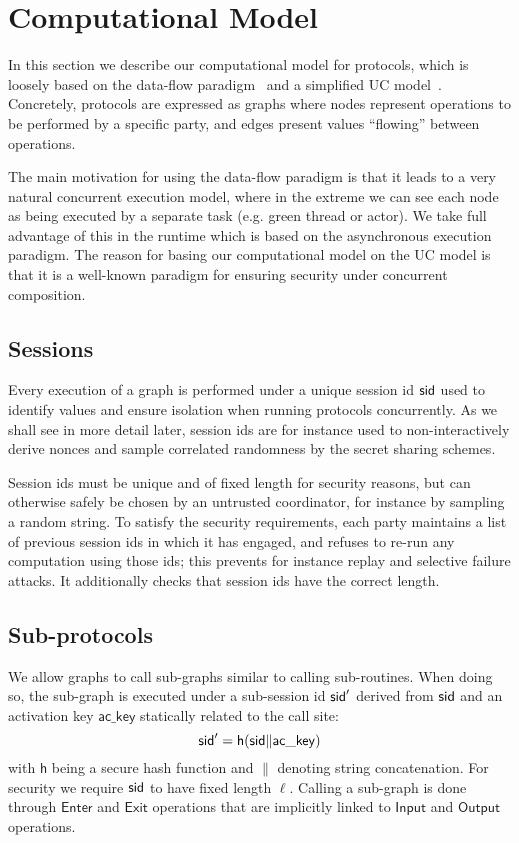 \section{Computational Model}

In this section we describe our computational model for protocols, which is loosely based on the data-flow paradigm~\cite{abadi16} and a simplified UC model~\cite{canetti-cohen-lindell15}. Concretely, protocols are expressed as graphs where nodes represent operations to be performed by a specific party, and edges present values ``flowing'' between operations.

The main motivation for using the data-flow paradigm is that it leads to a very natural concurrent execution model, where in the extreme we can see each node as being executed by a separate task (e.g. green thread or actor). We take full advantage of this in the runtime which is based on the asynchronous execution paradigm. The reason for basing our computational model on the UC model is that it is a well-known paradigm for ensuring security under concurrent composition.


\subsection{Sessions}

Every execution of a graph is performed under a unique session id $\mathsf{sid}$ used to identify values and ensure isolation when running protocols concurrently. As we shall see in more detail later, session ids are for instance used to non-interactively derive nonces and sample correlated randomness by the secret sharing schemes.

Session ids must be unique and of fixed length for security reasons, but can otherwise safely be chosen by an untrusted coordinator, for instance by sampling a random string. To satisfy the security requirements, each party maintains a list of previous session ids in which it has engaged, and refuses to re-run any computation using those ids; this prevents for instance replay and selective failure attacks. It additionally checks that session ids have the correct length.


\subsection{Sub-protocols}

We allow graphs to call sub-graphs similar to calling sub-routines. When doing so, the sub-graph is executed under a sub-session id $\mathsf{sid}'$ derived from $\mathsf{sid}$ and an activation key $\mathsf{ac\_key}$ statically related to the call site:
$$
\mathsf{sid}' = \mathsf{h}( \mathsf{sid} \| \mathsf{ac\_key} )
$$
with $\mathsf{h}$ being a secure hash function and $\|$ denoting string concatenation. For security we require $\mathsf{sid}$ to have fixed length $\ell$. Calling a sub-graph is done through $\mathsf{Enter}$ and $\mathsf{Exit}$ operations that are implicitly linked to $\mathsf{Input}$ and $\mathsf{Output}$ operations.


